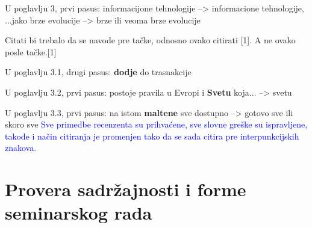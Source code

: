 \documentclass[a4paper]{report}
\newcommand{\odgovor}[1]{\textcolor{blue}{#1}}
\begin{document}
U poglavlju 3, prvi pasus: informacijone tehnologije --> informacione tehnologije, ...jako brze evolucije --> brze ili veoma brze evolucije

Citati bi trebalo da se navode pre tačke, odnosno ovako citirati [1]. A ne ovako posle tačke.[1] 

U poglavlju 3.1, drugi pasus: \textbf{dodje} do trasnakcije

U poglavlju 3.2, prvi pasus: postoje pravila u Evropi i \textbf{Svetu} koja... --> svetu 

U poglavlju 3.3, prvi pasus: na istom \textbf{maltene} sve dostupno --> gotovo sve ili skoro sve
\odgovor{Sve primedbe recenzenta su prihvaćene, sve slovne greške su ispravljene, takođe i način citiranja je promenjen tako da se sada citira pre interpunkcijskih znakova.}

\section{Provera sadržajnosti i forme seminarskog rada}
\end{document}
